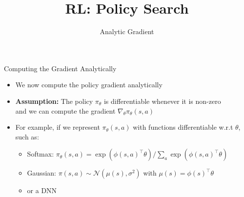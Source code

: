 \documentclass[aspectratio=169]{../latex_main/tntbeamer}  %
\title[RL: Analytic Gradient]{RL: Policy Search}
\subtitle{Analytic Gradient}
\begin{document}
	
	\maketitle

\begin{frame}[c]{Computing the Gradient Analytically}

\begin{itemize}
	\item We now compute the policy gradient analytically
	\item \textbf{Assumption:} The policy $\pi_\theta$ is differentiable whenever it is non-zero\\
	 and we can compute the gradient $\nabla_\theta \pi_\theta (s,a)$
        \item For example, if we represent $\pi_\theta (s,a)$ with functions differentiable w.r.t $\theta$, such as:
        \begin{itemize}
                \item Softmax: $\pi_\theta (s,a) = \exp(\phi(s,a)^\intercal\theta) / \sum_{a} \exp(\phi(s,a)^\intercal\theta)$
                \item Gaussian: $\pi(s,a) \sim \mathcal{N}(\mu(s), \sigma^2)$ with $\mu(s) = \phi(s)^\intercal \theta$
                \item or a DNN
        \end{itemize}

\end{itemize}

\end{frame}
\end{document}
